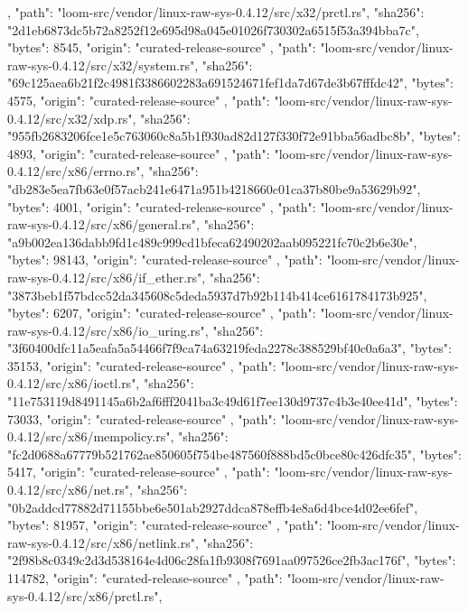{{    },
    {
      "path": "loom-src/vendor/linux-raw-sys-0.4.12/src/x32/prctl.rs",
      "sha256": "2d1eb6873dc5b72a8252f12e695d98a045e01026f730302a6515f53a394bba7c",
      "bytes": 8545,
      "origin": "curated-release-source"
    },
    {
      "path": "loom-src/vendor/linux-raw-sys-0.4.12/src/x32/system.rs",
      "sha256": "69c125aea6b21f2c4981f3386602283a691524671fef1da7d67de3b67fffdc42",
      "bytes": 4575,
      "origin": "curated-release-source"
    },
    {
      "path": "loom-src/vendor/linux-raw-sys-0.4.12/src/x32/xdp.rs",
      "sha256": "955fb2683206fce1e5c763060c8a5b1f930ad82d127f330f72e91bba56adbc8b",
      "bytes": 4893,
      "origin": "curated-release-source"
    },
    {
      "path": "loom-src/vendor/linux-raw-sys-0.4.12/src/x86/errno.rs",
      "sha256": "db283e5ea7fb63e0f57acb241e6471a951b4218660c01ca37b80be9a53629b92",
      "bytes": 4001,
      "origin": "curated-release-source"
    },
    {
      "path": "loom-src/vendor/linux-raw-sys-0.4.12/src/x86/general.rs",
      "sha256": "a9b002ea136dabb9fd1c489c999cd1bfeca62490202aab095221fc70c2b6e30e",
      "bytes": 98143,
      "origin": "curated-release-source"
    },
    {
      "path": "loom-src/vendor/linux-raw-sys-0.4.12/src/x86/if_ether.rs",
      "sha256": "3873beb1f57bdcc52da345608c5deda5937d7b92b114b414ce6161784173b925",
      "bytes": 6207,
      "origin": "curated-release-source"
    },
    {
      "path": "loom-src/vendor/linux-raw-sys-0.4.12/src/x86/io_uring.rs",
      "sha256": "3f60400dfc11a5eafa5a54466f7f9ca74a63219feda2278c388529bf40c0a6a3",
      "bytes": 35153,
      "origin": "curated-release-source"
    },
    {
      "path": "loom-src/vendor/linux-raw-sys-0.4.12/src/x86/ioctl.rs",
      "sha256": "11e753119d8491145a6b2af6fff2041ba3c49d61f7ee130d9737c4b3e40ee41d",
      "bytes": 73033,
      "origin": "curated-release-source"
    },
    {
      "path": "loom-src/vendor/linux-raw-sys-0.4.12/src/x86/mempolicy.rs",
      "sha256": "fc2d0688a67779b521762ae850605f754be487560f888bd5c0bce80c426dfc35",
      "bytes": 5417,
      "origin": "curated-release-source"
    },
    {
      "path": "loom-src/vendor/linux-raw-sys-0.4.12/src/x86/net.rs",
      "sha256": "0b2addcd77882d71155bbe6e501ab2927ddca878effb4e8a6d4bce4d02ee6fef",
      "bytes": 81957,
      "origin": "curated-release-source"
    },
    {
      "path": "loom-src/vendor/linux-raw-sys-0.4.12/src/x86/netlink.rs",
      "sha256": "2f98b8c0349c2d3d538164e4d06c28fa1fb9308f7691aa097526ce2fb3ac176f",
      "bytes": 114782,
      "origin": "curated-release-source"
    },
    {
      "path": "loom-src/vendor/linux-raw-sys-0.4.12/src/x86/prctl.rs",
}}

